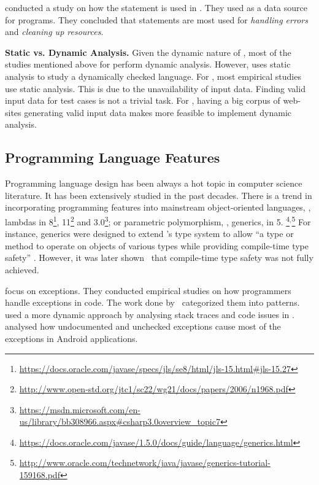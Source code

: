 \cite{nagappanEmpiricalStudyGoto2015} conducted a study on how the
 statement is used in \cc{}.
They used \github{} as a data source for \cc{} programs.
They concluded that  statements are most used for
\emph{handling errors} and \emph{cleaning up resources}.

\textbf{Static vs. Dynamic Analysis.}
Given the dynamic nature of \javascript, most of the studies mentioned
above for \javascript{} perform dynamic analysis.
However, \cite{callauHowWhyDevelopers2013} uses static analysis to study
a dynamically checked language.
For \java{}, most empirical studies use static analysis.
This is due to the unavailability of input data.
Finding valid input data for test cases is not a trivial task.
For \javascript{}, having a big corpus of web-sites generating valid
input data makes more feasible to implement dynamic analysis.

\subsection*{Programming Language Features}

Programming language design has been always a hot topic in computer science literature.
It has been extensively studied in the past decades.
There is a trend in incorporating programming features into mainstream object-oriented languages, \eg,
lambdas in \java{} 8\footnote{\url{https://docs.oracle.com/javase/specs/jls/se8/html/jls-15.html\#jls-15.27}},
\cpp{}11\footnote{\url{http://www.open-std.org/jtc1/sc22/wg21/docs/papers/2006/n1968.pdf}} and
\csharp{} 3.0\footnote{\url{https://msdn.microsoft.com/en-us/library/bb308966.aspx\#csharp3.0overview\_topic7}};
or parametric polymorphism, \ie{}, generics, in \java{} 5.%
\footnote{\url{https://docs.oracle.com/javase/1.5.0/docs/guide/language/generics.html}}\(^{,}\)\footnote{\url{http://www.oracle.com/technetwork/java/javase/generics-tutorial-159168.pdf}}
For instance, \java{} generics were designed to extend
\java's type system to allow
``a type or method to operate on objects of various types while
providing compile-time type safety''
\citep{Gosling:2013:JLS:2462622}.
However, it was later shown~\citep{aminJavaScalaType2016} that 
compile-time type safety was not fully achieved.

\cite{keryExaminingProgrammerPractices2016,asaduzzamanHowDevelopersUse2016} focus on exceptions.
They conducted empirical studies on how programmers handle exceptions in \java{} code.
The work done by~\cite{nakshatriAnalysisExceptionHandling2016} categorized them into patterns.
\cite{coelhoUnveilingExceptionHandling2015} used a more dynamic approach by analysing stack traces and code issues in \github{}.
\cite{kechagiaUndocumentedUncheckedExceptions2014} analysed how undocumented and
unchecked exceptions cause most of the exceptions in
Android applications.

